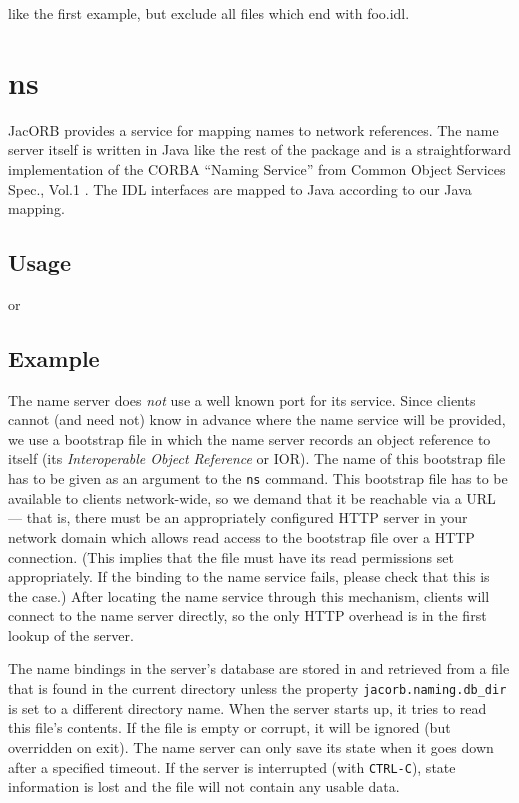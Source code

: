 like the first example, but exclude all files which end with foo.idl.

\section{ns}

JacORB provides a service for mapping names to network references. The
name server itself is written in Java like the rest of the package and
is a  straightforward implementation  of the CORBA  ``Naming Service''
from  Common  Object Services  Spec.,  Vol.1  \cite{OMG1997}. The  IDL
interfaces are mapped to Java according to our Java mapping.

\subsection*{Usage}


or


\subsection*{Example}


The name server does {\it not}  use a well known port for its service.
Since clients  cannot (and  need not) know  in advance where  the name
service will  be provided, we use  a bootstrap file in  which the name
server records  an object reference to itself  (its {\it Interoperable
Object Reference} or  IOR). The name of this bootstrap  file has to be
given as an argument to the  {\tt ns} command. This bootstrap file has
to  be available  to clients  network-wide, so  we demand  that  it be
reachable  via a  URL  --- that  is,  there must  be an  appropriately
configured HTTP server in your network domain which allows read access
to the bootstrap  file over a HTTP connection.  (This implies that the
file must have its read  permissions set appropriately. If the binding
to the name service fails, please  check that this is the case.) After
locating the name service through this mechanism, clients will connect
to the name server directly, so the only HTTP overhead is in the first
lookup of the server.

The name bindings in the server's database are stored in and retrieved
from a file that is found in the current directory unless the property
{\tt jacorb.naming.db\_dir} is set to a different directory name. When
the server  starts up, it tries  to read this file's  contents. If the
file  is  empty or  corrupt,  it will  be  ignored  (but overridden  on
exit). The name server can only save its state when it goes down after
a specified timeout. If the server is interrupted (with {\tt CTRL-C}),
state information  is lost  and the file  will not contain  any usable
data.

